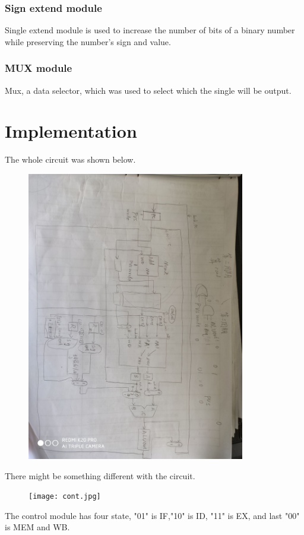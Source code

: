 \documentclass[12pt,a4paper]{article}
\begin{document}
\subsubsection{Sign extend module}

Single extend module is used to increase the number of bits of a binary number while preserving the number's sign and value. 

\subsubsection{MUX module}

Mux, a data selector, which was used to select which the single will be output.

\newpage

\section{Implementation}

The whole circuit was shown below.

\begin{figure}[H]
  \centering
  \includegraphics[height=5in, angle=90]{Lens.jpg}
  \end{figure}
There might be something different with the circuit.
  \begin{figure}[H]
    \centering
    \texttt{[image: cont.jpg]}
    \end{figure}
The control module has four state, "01" is IF,"10" is ID, "11" is EX, and last "00" is MEM and WB.
\newpage
\end{document}
